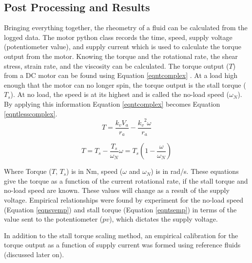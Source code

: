 \documentclass[twoside,a4]{report}
\def\br{\newline \newline \noindent}
\begin{document}
	\subsection*{Post Processing and Results} %
	Bringing everything together, the rheometry of a fluid can be calculated from the logged data. The motor python class records the time, speed, supply voltage (potentiometer value), and supply current which is used to calculate the torque output from the motor. Knowing the torque and the rotational rate, the shear stress, strain rate, and the viscosity can be calculated. The torque output (\(T\)) from a DC motor can be found using Equation \ref{eqntcomplex} \cite{backdcmotor}. At a load high enough that the motor can no longer spin, the torque output is the stall torque (\(T_s\)). At no load, the speed is at its highest and is called the no-load speed (\(\omega_N\)). By applying this information Equation \ref{eqntcomplex} becomes Equation \ref{eqntlesscomplex}.
	\begin{equation}
		T = \frac{k_v V_a}{r_a} - \frac{{{k_v}^2} \omega}{r_a}
		\label{eqntcomplex}
	\end{equation}
	
	
	\begin{equation}
		T = T_s - \frac{T_s}{\omega_N} \omega = T_s \left(1 - \frac{\omega}{\omega_N}\right)
		\label{eqntlesscomplex}
	\end{equation}
	
	
	\noindent
	Where Torque (\(T\), \(T_s\)) is in Nm, speed (\(\omega\) and \(\omega_N\)) is in rad/s. These equations give the torque as a function of the current rotational rate, if the stall torque and no-load speed are known. These values will change as a result of the supply voltage. Empirical relationships were found by experiment for the no-load speed (Equation \ref{eqnsvemp}) and stall torque (Equation \ref{eqntsemp}) in terms of the value sent to the potentiometer (\(pv\)), which dictates the supply voltage.\br
	
	In addition to the stall torque scaling method, an empirical calibration for the torque output as a function of supply current was formed using reference fluids (discussed later on).
	
\end{document}
